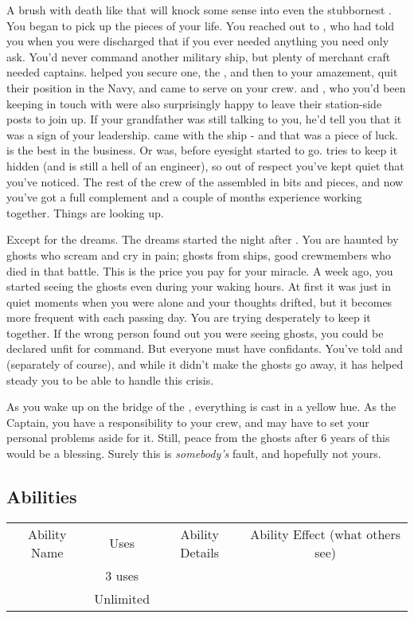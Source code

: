 \documentclass[char]{TMFHope}
\begin{document}
A brush with death like that will knock some sense into even the stubbornest \cCap{\human}. You began to pick up the pieces of your life. You reached out to \cXO{}, who had told you when you were discharged that if you ever needed anything you need only ask. You'd never command another military ship, but plenty of merchant craft needed captains. \cXO{} helped you secure one, the \pNew{}, and then to your amazement, quit their position in the Navy, and came to serve on your crew. \cMed{} and \cSci{}, who you'd been keeping in touch with were also surprisingly happy to leave their station-side posts to join up. If your grandfather was still talking to you, he'd tell you that it was a sign of your leadership. \cEng{} came with the ship - and that was a piece of luck. \cEng{\They} is the best in the business. Or was, before \cEng{\their} eyesight started to go. \cEng{} tries to keep it hidden (and \cEng{\they} is still a hell of an engineer), so out of respect you've kept quiet that you've noticed. The rest of the crew of the \pNew{} assembled in bits and pieces, and now you've got a full complement and a couple of months experience working together. Things are looking up.

Except for the dreams. The dreams started the night after \pBattle{}. You are haunted by ghosts who scream and cry in pain; ghosts from \pPlan{} ships, good crewmembers who died in that battle. This is the price you pay for your miracle.	A week ago, you started seeing the ghosts even during your waking hours. At first it was just in quiet moments when you were alone and your thoughts drifted, but it becomes more frequent with each passing day. You are trying desperately to keep it together. If the wrong person found out you were seeing ghosts, you could be declared unfit for command. But everyone must have confidants. You've told \cMed{} and \cSci{} (separately of course), and while it didn't make the ghosts go away, it has helped steady you to be able to handle this crisis. 

As you wake up on the bridge of the \pNew{}, everything is cast in a yellow hue. As the Captain, you have a responsibility to your crew, and may have to set your personal problems aside for it. Still, peace from the ghosts after 6 years of this would be a blessing. Surely this is \emph{somebody's} fault, and hopefully not yours. 

\subsection{Abilities}
\begin{tabular}{ |c|c|c|c| } 
 \hline
 Ability Name & Uses & Ability Details & Ability Effect (what others see) \\ 
 \aTruth{\MyName} & 3 uses & \aTruth{\MYtext} & \aTruth{\MYeffect} \\ 
 \aCalculate{\MyName} & Unlimited & \aCalculate{\MYtext} & \aCalculate{\MYeffect}\\ 
 \hline
\end{tabular}
\end{document}
